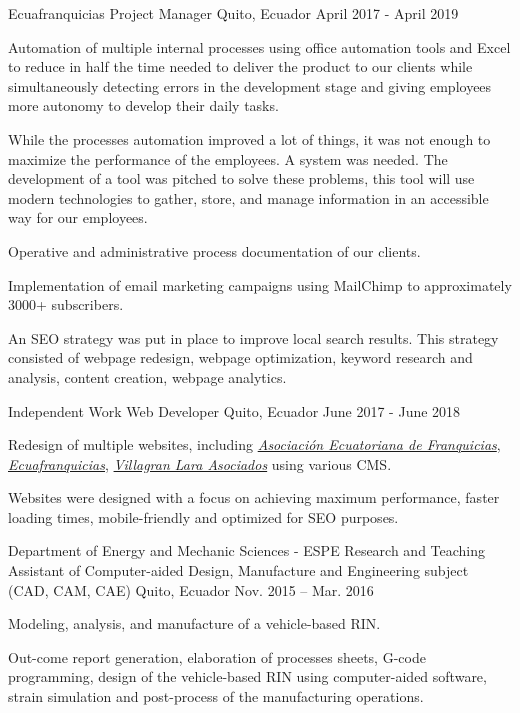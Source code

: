 
\begin{cventries}

  \cventry
    {Ecuafranquicias}
    {Project Manager}
    {Quito, Ecuador}
    {April 2017 - April 2019}
    {
      \begin{cvitems}
        \item {Automation of multiple internal processes using oﬀice automation tools and Excel to reduce in half the time needed to deliver the product to our clients while simultaneously detecting errors in the development stage and giving employees more autonomy to develop their daily tasks.}
        \item {While the processes automation improved a lot of things, it was not enough to maximize the performance of the employees. A system was needed. The development of a tool was pitched to solve these problems, this tool will use modern technologies to gather, store, and manage information in an accessible way for our employees.}
        \item {Operative and administrative process documentation of our clients.}
        \item {Implementation of email marketing campaigns using MailChimp to approximately 3000+ subscribers.}
        \item {An SEO strategy was put in place to improve local search results. This strategy consisted of webpage redesign, webpage optimization, keyword research and analysis, content creation, webpage analytics.}
      \end{cvitems}
    }

    \cventry
      {Independent Work}
      {Web Developer}
      {Quito, Ecuador}
      {June 2017 - June 2018}
      {
        \begin{cvitems}
          \item {Redesign of multiple websites, including \href{https://aefran.org}{\textit{Asociación Ecuatoriana de Franquicias}}, \href{http://www.ecuafranquicias.com}{\textit{Ecuafranquicias}}, \href{http://www.villagranlara.com}{\textit{Villagran Lara Asociados}} using various CMS.}
          \item {Websites were designed with a focus on achieving maximum performance, faster loading times, mobile-friendly and optimized for SEO purposes.}                       
        \end{cvitems} 
      }

  \cventry
    {Department of Energy and Mechanic Sciences - ESPE}
    {Research and Teaching Assistant of Computer-aided Design, Manufacture and Engineering subject (CAD, CAM, CAE)	}
    {Quito, Ecuador}
    {Nov. 2015 – Mar. 2016}
    {
      \begin{cvitems}
        \item {Modeling, analysis, and manufacture of a vehicle-based RIN.}
        \item {Out-come report generation, elaboration of processes sheets, G-code programming, design of the vehicle-based RIN using computer-aided software, strain simulation and post-process of the manufacturing operations.}
      \end{cvitems}
    }
  

\end{cventries}
